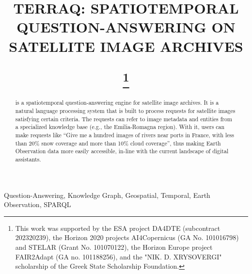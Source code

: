 \documentclass[conference,a4paper]{IEEEtran}
\begin{document}
\title{

\uppercase{TerraQ: Spatiotemporal Question-Answering on Satellite Image Archives}

\thanks{	This work was supported by the ESA project DA4DTE (subcontract 202320239), the Horizon 2020 projects AI4Copernicus (GA No. 101016798) and STELAR (Grant No. 101070122), the Horizon Europe project FAIR2Adapt (GA no. 101188256), and the "NIK. D. XRYSOVERGI" scholarship of the Greek State Scholarship Foundation.}

}

\author{
}


\maketitle
\begin{abstract}
	\EngineName{} is a spatiotemporal question-answering engine for satellite image archives. It is a natural language processing system that is built to process requests for satellite images satisfying certain criteria. The requests can refer to image metadata and entities from a specialized knowledge base (e.g., the Emilia-Romagna region). With it, users can make requests like “Give me a hundred images of rivers near ports in France, with less than 20\% snow coverage and more than 10\% cloud coverage”, thus making Earth Observation data more easily accessible, in-line with the current landscape of digital assistants.
\end{abstract}

\begin{IEEEkeywords}
Question-Answering, Knowledge Graph, Geospatial, Temporal, Earth Observation, SPARQL
\end{IEEEkeywords}






\end{document}
